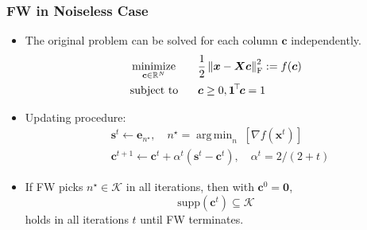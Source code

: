 \documentclass[10pt,xcolor={usenames,dvipsnames,table}]{beamer}
\newcommand{\norm}[1]{\left\lVert#1\right\rVert}
\newcommand{\T}{\!\top\!}
\DeclareMathOperator*{\argmin}{arg\,min}
\DeclareMathOperator*{\minimize}{minimize}
\begin{document}
\begin{frame}[label=fine]
    \frametitle{FW in Noiseless Case}
    \begin{itemize}
        \item The original problem can be solved for each column $\bm{c}$ independently.
    \begin{alignat*}{2}
        & \minimize_{\bm{c} \in \mathbb{R}^{N}} \quad && \dfrac{1}{2} \norm{\bm{x} - \bm{X}\bm{c}}_{\rm F}^2 := f(\bm{c}) \\
        & \text{\rm subject to} && \bm{c} \geq 0, \bm{1}^{\T}\bm{c} = 1
    \end{alignat*}
    \item Updating procedure:
    \begin{align*}
    &\bm{s}^{t} \leftarrow \bm{e}_{n^{\star}}, \quad n^{\star} = \argmin_{n} \; [\nabla f(\bm{x}^{t})] \\
    &\bm{c}^{t+1} \leftarrow \bm{c}^{t} + \alpha^{t} (\bm{s}^{t} - \bm{c}^{t}) , \quad \alpha^{t}=2/(2+t) 
    \end{align*}

    \item If FW picks $n^{\star} \in \mathcal{K}$ in all iterations, then with $\bm{c}^{0}=\bm{0}$, 
        \[\text{supp}(\bm{c}^{t}) \subseteq \mathcal{K}\] 
        holds in all iterations $t$ until FW terminates.
    \end{itemize}
\end{frame}
\end{document}
